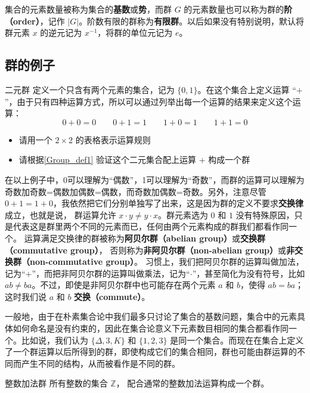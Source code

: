 集合的元素数量被称为集合的\textbf{基数}或\textbf{势}，而群 $G$ 的元素数量也可以称为群的\textbf{阶（order）}，记作 $|G|$。阶数有限的群称为\textbf{有限群}。以后如果没有特别说明，默认将群元素 $x$ 的逆元记为 $x^{-1}$，将群的单位元记为 $e$。

\subsection{群的例子}

\begin{exercise}{二元群}\label{Group_exe1}
定义一个只含有两个元素的集合，记为 $\{0, 1\}$。在这个集合上定义运算 “$+$”，由于只有四种运算方式，所以可以通过列举出每一个运算的结果来定义这个运算：
\begin{equation}\label{Group_eq1}
0+0=0 \qquad 0+1=1 \qquad 1+0=1 \qquad 1+1=0
\end{equation}
\begin{itemize}
\item 请用一个 $2\times2$ 的表格表示运算规则
\item 请根据\autoref{Group_def1} 验证这个二元集合配上运算 $+$ 构成一个群
\end{itemize}
\end{exercise}

在以上例子中，0可以理解为“偶数”，1可以理解为“奇数”，而群的运算可以理解为奇数加奇数=偶数加偶数=偶数，而奇数加偶数=奇数。另外，注意尽管 $0+1=1+0$，我依然把它们分别单独写了出来，这是因为群的定义不要求\textbf{交换律}成立，也就是说， 群运算允许 $x\cdot y\neq y\cdot x$。群元素选为 $0$ 和 $1$ 没有特殊原因，只是代表这是群里两个不同的元素而已，任何由两个元素构成的群我们都看作同一个。 运算满足交换律的群被称为\textbf{阿贝尔群（abelian group）}或\textbf{交换群（commutative group）}， 否则称为\textbf{非阿贝尔群（non-abelian group）}或\textbf{非交换群（non-commutative group）}。 习惯上，我们把阿贝尔群的运算叫做加法，记为“$+$”，而把非阿贝尔群的运算叫做乘法，记为“$\cdot$”，甚至简化为没有符号，比如 $ab\not= ba$。不过，即使是非阿贝尔群中也可能存在两个元素 $a$ 和 $b$，使得 $ab=ba$；这时我们说 $a$ 和 $b$ \textbf{交换（commute）}。

一般地，由于在朴素集合论中我们最多只讨论了集合的基数问题，集合中的元素具体如何命名是没有约束的，因此在集合论意义下元素数目相同的集合都看作同一个。比如说，我们认为 $\{\Delta,3, K\}$ 和 $\{1,2,3\}
$ 是同一个集合。而现在在集合上定义了一个群运算以后所得到的群，即使构成它们的集合相同，群也可能由群运算的不同而产生不同的结构，从而被看作是不同的群。

\begin{example}{整数加法群}\label{Group_ex1}
所有整数的集合 $\mathbb Z$， 配合通常的整数加法运算构成一个群。
\end{example}

